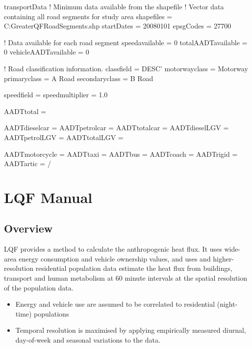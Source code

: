 \documentclass[letterpaper,10pt,english]{sphinxmanual}
\begin{document}
%
\begin{sphinxVerbatim}[commandchars=\\\{\}]
\PYGZam{}transportData
   ! Minimum data available from the shapefile
   ! Vector data containing all road segments for study area
   shapefiles = \PYGZsq{}C:\PYGZbs{}GreaterQF\PYGZbs{}RoadSegments.shp\PYGZsq{}
   startDates = \PYGZsq{}2008\PYGZhy{}01\PYGZhy{}01\PYGZsq{}
   epsgCodes = 27700

   ! Data available for each road segment
   speed\PYGZus{}available = 0
   total\PYGZus{}AADT\PYGZus{}available = 0
   vehicle\PYGZus{}AADT\PYGZus{}available = 0

   ! Road classification information.
   class\PYGZus{}field = \PYGZsq{}DESC\PYGZus{}’
   motorway\PYGZus{}class = \PYGZsq{}Motorway\PYGZsq{}
   primary\PYGZus{}class = \PYGZsq{}A Road\PYGZsq{}
   secondary\PYGZus{}class = \PYGZsq{}B Road\PYGZsq{}

   speed\PYGZus{}field =
   speed\PYGZus{}multiplier = 1.0

   AADT\PYGZus{}total =

   AADT\PYGZus{}diesel\PYGZus{}car =
   AADT\PYGZus{}petrol\PYGZus{}car =
   AADT\PYGZus{}total\PYGZus{}car =
   AADT\PYGZus{}diesel\PYGZus{}LGV =
   AADT\PYGZus{}petrol\PYGZus{}LGV =
   AADT\PYGZus{}total\PYGZus{}LGV =

   AADT\PYGZus{}motorcycle =
   AADT\PYGZus{}taxi =
   AADT\PYGZus{}bus =
   AADT\PYGZus{}coach =
   AADT\PYGZus{}rigid =
   AADT\PYGZus{}artic =
/
\end{sphinxVerbatim}


\section{LQF Manual}
\label{\detokenize{OtherManuals/LQF_Manual:lqf-manual}}\label{\detokenize{OtherManuals/LQF_Manual::doc}}

\subsection{Overview}
\label{\detokenize{OtherManuals/LQF_Manual:overview}}
LQF provides a method to calculate the anthropogenic heat flux. It uses
wide-area energy consumption and vehicle ownership values, and uses and
higher-resolution residential population data estimate the heat flux
from buildings, transport and human metabolism at 60 minute intervals at
the spatial resolution of the population data.
\begin{itemize}
\item {} 
Energy and vehicle use are assumed to be correlated to residential
(night-time) populations

\item {} 
Temporal resolution is maximised by applying empirically measured
diurnal, day-of-week and seasonal variations to the data.

\end{itemize}
\end{document}
